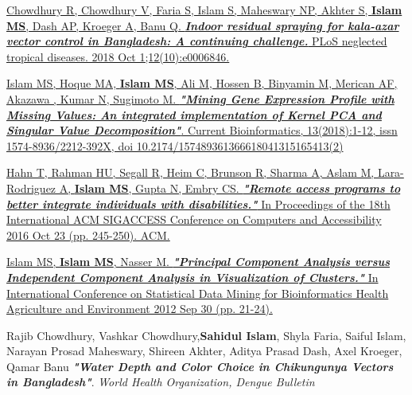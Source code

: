 
\begin{cvparagraph}
\begin{enumerate}[label={[\arabic*]}]
		\item {\href{https://journals.plos.org/plosntds/article?id=10.1371/journal.pntd.0006846} {Chowdhury R, Chowdhury V, Faria S, Islam S, Maheswary NP, Akhter S, \textbf{Islam MS}, Dash AP, Kroeger A, Banu Q.  \textbf{\textit{Indoor residual spraying for kala-azar vector control in Bangladesh: A continuing challenge.}} PLoS neglected tropical diseases. 2018 Oct 1;12(10):e0006846.}}	

		\item {\href{http://www.eurekaselect.com/node/161266/article/mining-gene-expression-profile-with-missing-values-an-integration-of-kernel-pca-and-robust-singular-values-decomposition} {Islam MS, Hoque MA, \textbf{Islam MS}, Ali M, Hossen B, Binyamin M, Merican AF, Akazawa , Kumar N, Sugimoto M. \textbf{\textit{"Mining Gene Expression Profile with Missing Values: An integrated implementation of Kernel PCA and Singular Value Decomposition"}}. Current Bioinformatics, 13(2018):1-12, issn 1574-8936/2212-392X, doi 10.2174/157489361366618041315165413(2)}}

		\item {\href{https://dl.acm.org/citation.cfm?id=2982182} {Hahn T, Rahman HU, Segall R, Heim C, Brunson R, Sharma A, Aslam M, Lara-Rodriguez A, \textbf{Islam MS}, Gupta N, Embry CS. \textbf{\textit{"Remote access programs to better integrate individuals with disabilities."}} In Proceedings of the 18th International ACM SIGACCESS Conference on Computers and Accessibility 2016 Oct 23 (pp. 245-250). ACM.}}


		\item {\href{https://www.researchgate.net/profile/Mdsaimul_Islam/publication/283070817_PCA_versus_ICA_in_Visualization_of_Clusters/links/56288c9108aef25a243cfedb.pdf} {Islam MS, \textbf{Islam MS}, Nasser M. \textbf{\textit{"Principal Component Analysis versus Independent Component Analysis in Visualization of Clusters."}} In International Conference on Statistical Data Mining for Bioinformatics Health Agriculture and Environment 2012 Sep 30 (pp. 21-24).}}

		\item {Rajib Chowdhury, Vashkar Chowdhury,\textbf{Sahidul Islam},  Shyla Faria, Saiful Islam, Narayan Prosad Maheswary, Shireen Akhter, Aditya Prasad Dash, Axel Kroeger, Qamar Banu  \textbf{\textit{"Water Depth and Color Choice in Chikungunya Vectors in Bangladesh"}}. \textit{World Health Organization, Dengue Bulletin}}	



\end{enumerate}
\end{cvparagraph}
